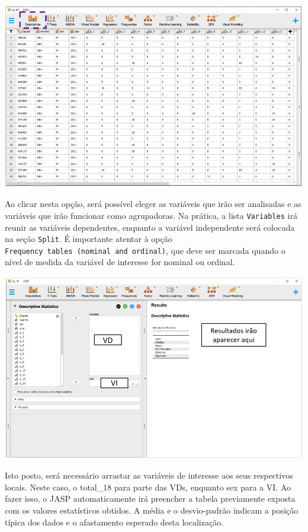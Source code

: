 \documentclass[
]{book}
\begin{document}
\includegraphics{./img/jasp_descriptives.png}

Ao clicar nesta opção, será possível eleger as variáveis que irão ser analisadas e as variáveis que irão funcionar como agrupadoras. Na prática, a lista \texttt{Variables} irá reunir as variáveis dependentes, enquanto a variável independente será colocada na seção \texttt{Split}. É importante atentar à opção \texttt{Frequency\ tables\ (nominal\ and\ ordinal)}, que deve ser marcada quando o nível de medida da variável de interesse for nominal ou ordinal.

\includegraphics{./img/jasp_descriptives2.png}

Isto posto, será necessário arrastar as variáveis de interesse aos seus respectivos locais. Neste caso, o total\_18 para parte das VDs, enquanto sex para a VI. Ao fazer isso, o JASP automaticamente irá preencher a tabela previamente exposta com os valores estatísticos obtidos. A média e o desvio-padrão indicam a posição típica dos dados e o afastamento esperado desta localização.
\end{document}
